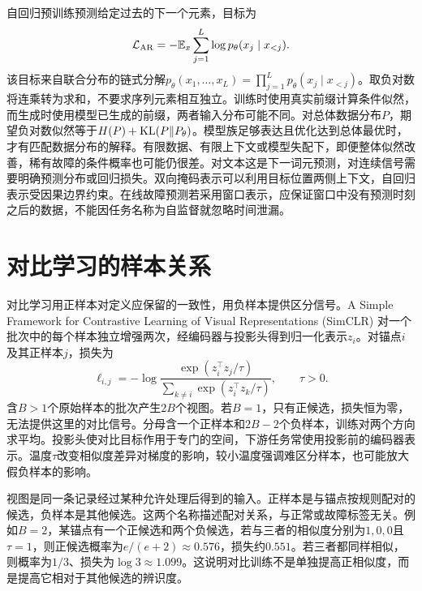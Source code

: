 自回归预训练预测给定过去的下一个元素，目标为
\begin{equation}
 \mathcal L_{\mathrm{AR}}=-\mathbb{E}_x\sum_{j=1}^{L}
 \log p_\theta(x_j\mid x_{<j}).
\end{equation}
该目标来自联合分布的链式分解$p_\theta(x_1,\ldots,x_L)=\prod_{j=1}^Lp_\theta(x_j\mid x_{<j})$。取负对数将连乘转为求和，不要求序列元素相互独立。训练时使用真实前缀计算条件似然，而生成时使用模型已生成的前缀，两者输入分布可能不同。对总体数据分布$P$，期望负对数似然等于$H(P)+\operatorname{KL}(P\|P_\theta)$。模型族足够表达且优化达到总体最优时，才有匹配数据分布的解释。有限数据、有限上下文或模型失配下，即便整体似然改善，稀有故障的条件概率也可能仍很差。对文本这是下一词元预测，对连续信号需要明确预测分布或回归损失。双向掩码表示可以利用目标位置两侧上下文，自回归表示受因果边界约束。在线故障预测若采用窗口表示，应保证窗口中没有预测时刻之后的数据，不能因任务名称为自监督就忽略时间泄漏。

\section{对比学习的样本关系}
对比学习用正样本对定义应保留的一致性，用负样本提供区分信号。A Simple Framework for Contrastive Learning of Visual Representations (SimCLR) 对一个批次中的每个样本独立增强两次，经编码器与投影头得到归一化表示$z_i$\cite{chen2020simclr}。对锚点$i$及其正样本$j$，损失为
\begin{equation}
 \ell_{i,j}=-\log
 \frac{\exp(z_i^\top z_j/\tau)}
 {\sum_{k\ne i}\exp(z_i^\top z_k/\tau)},\qquad \tau>0.
\end{equation}
含$B>1$个原始样本的批次产生$2B$个视图。若$B=1$，只有正候选，损失恒为零，无法提供这里的对比信号。分母含一个正样本和$2B-2$个负样本，训练对两个方向求平均。投影头使对比目标作用于专门的空间，下游任务常使用投影前的编码器表示。温度$\tau$改变相似度差异对梯度的影响，较小温度强调难区分样本，也可能放大假负样本的影响。

视图是同一条记录经过某种允许处理后得到的输入。正样本是与锚点按规则配对的候选，负样本是其他候选。这两个名称描述配对关系，与正常或故障标签无关。例如$B=2$，某锚点有一个正候选和两个负候选，若与三者的相似度分别为$1,0,0$且$\tau=1$，则正候选概率为$e/(e+2)\approx0.576$，损失约$0.551$。若三者都同样相似，则概率为$1/3$、损失为$\log3\approx1.099$。这说明对比训练不是单独提高正相似度，而是提高它相对于其他候选的辨识度。

